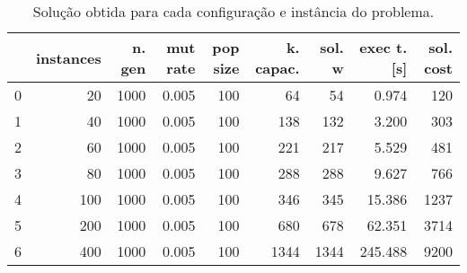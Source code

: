 \documentclass{article}
\begin{document}
\begin{table}
\centering
\begin{tabular}{lrrrrrrrr}
\toprule
{} &  instances &  n. gen &  mut rate &  pop size &  k. capac. &  sol. w &  exec t. [s] &  sol. cost \\
\midrule
0 &         20 &    1000 &     0.005 &       100 &         64 &      54 &        0.974 &        120 \\
1 &         40 &    1000 &     0.005 &       100 &        138 &     132 &        3.200 &        303 \\
2 &         60 &    1000 &     0.005 &       100 &        221 &     217 &        5.529 &        481 \\
3 &         80 &    1000 &     0.005 &       100 &        288 &     288 &        9.627 &        766 \\
4 &        100 &    1000 &     0.005 &       100 &        346 &     345 &       15.386 &       1237 \\
5 &        200 &    1000 &     0.005 &       100 &        680 &     678 &       62.351 &       3714 \\
6 &        400 &    1000 &     0.005 &       100 &       1344 &    1344 &      245.488 &       9200 \\
\bottomrule
\end{tabular}
\caption{Solução obtida para cada configuração e instância do problema.}
\label{table:all-data}
\end{table}
\end{document}
